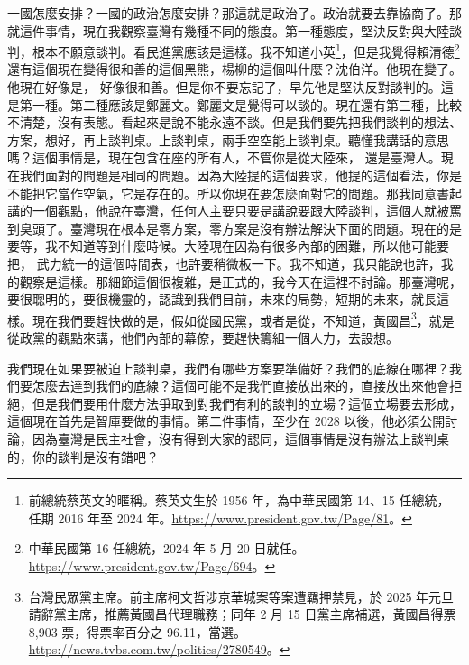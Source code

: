 \hypertarget{w05:cue:237}{}一國怎麼安排？一國的政治怎麼安排？那這就是政治了。政治就要去靠協商了。那就這件事情，現在我觀察臺灣有幾種不同的態度。第一種態度，堅決反對與大陸談判，根本不願意談判。看民進黨應該是這樣。我不知道小英\footnote{前總統蔡英文的暱稱。蔡英文生於 1956 年，為中華民國第 14、15 任總統，任期 2016 年至 2024 年。\url{https://www.president.gov.tw/Page/81}。}，但是我覺得賴清德\footnote{中華民國第 16 任總統，2024 年 5 月 20 日就任。\url{https://www.president.gov.tw/Page/694}。}還有這個現在變得很和善的這個黑熊，楊柳的這個叫什麼？沈伯洋。他現在變了。他現在好像是，
\hypertarget{w05:cue:238}{}好像很和善。但是你不要忘記了，早先他是堅決反對談判的。這是第一種。第二種應該是鄭麗文。鄭麗文是覺得可以談的。現在還有第三種，比較不清楚，沒有表態。看起來是說不能永遠不談。但是我們要先把我們談判的想法、方案，想好，再上談判桌。上談判桌，兩手空空能上談判桌。聽懂我講話的意思嗎？這個事情是，現在包含在座的所有人，不管你是從大陸來，
\hypertarget{w05:cue:239}{}還是臺灣人。現在我們面對的問題是相同的問題。因為大陸提的這個要求，他提的這個看法，你是不能把它當作空氣，它是存在的。所以你現在要怎麼面對它的問題。那我同意書起講的一個觀點，他說在臺灣，任何人主要只要是講說要跟大陸談判，這個人就被罵到臭頭了。臺灣現在根本是零方案，零方案是沒有辦法解決下面的問題。現在的是要等，我不知道等到什麼時候。大陸現在因為有很多內部的困難，所以他可能要把，
\hypertarget{w05:cue:240}{}武力統一的這個時間表，也許要稍微板一下。我不知道，我只能說也許，我的觀察是這樣。那細節這個很複雜，是正式的，我今天在這裡不討論。那臺灣呢，要很聰明的，要很機靈的，認識到我們目前，未來的局勢，短期的未來，就長這樣。現在我們要趕快做的是，假如從國民黨，或者是從，不知道，黃國昌\footnote{台灣民眾黨主席。前主席柯文哲涉京華城案等案遭羈押禁見，於 2025 年元旦請辭黨主席，推薦黃國昌代理職務；同年 2 月 15 日黨主席補選，黃國昌得票 8,903 票，得票率百分之 96.11，當選。\url{https://news.tvbs.com.tw/politics/2780549}。}，就是從政黨的觀點來講，他們內部的幕僚，要趕快籌組一個人力，去設想。

\hypertarget{w05:cue:241}{}我們現在如果要被迫上談判桌，我們有哪些方案要準備好？我們的底線在哪裡？我們要怎麼去達到我們的底線？這個可能不是我們直接放出來的，直接放出來他會拒絕，但是我們要用什麼方法爭取到對我們有利的談判的立場？這個立場要去形成，這個現在首先是智庫要做的事情。第二件事情，至少在 2028 以後，他必須公開討論，因為臺灣是民主社會，沒有得到大家的認同，這個事情是沒有辦法上談判桌的，你的談判是沒有錯吧？

